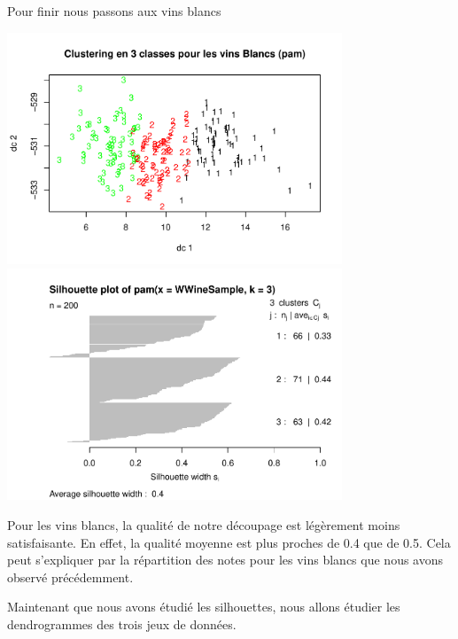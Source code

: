 \documentclass[
]{article}
\begin{document}
Pour finir nous passons aux vins blancs
\begin{center}
	\includegraphics[width=10cm]{repport_files/figure-latex/unnamed-chunk-14-1.pdf}
\includegraphics[width=10cm]{repport_files/figure-latex/unnamed-chunk-14-2.pdf}
\end{center}

Pour les vins blancs, la qualité de notre découpage est légèrement moins
satisfaisante. En effet, la qualité moyenne est plus proches de 0.4 que
de 0.5. Cela peut s'expliquer par la répartition des notes pour les vins
blancs que nous avons observé précédemment.

Maintenant que nous avons étudié les silhouettes, nous allons étudier
les dendrogrammes des trois jeux de données.
\end{document}
